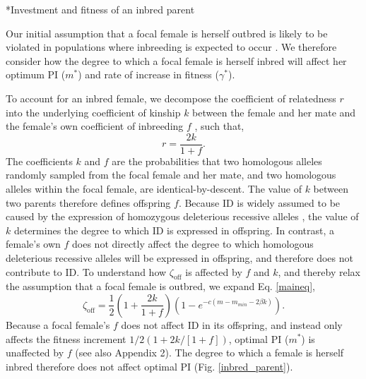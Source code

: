 \documentclass[12pt]{article}
\makeatletter
\renewcommand\subsection{\@startsection{subsection}{1}{-0.25in}{-0.5\baselineskip}{0.1\baselineskip}{\normalfont\normalsize\bfseries\textit}}
\makeatother
\begin{document}
\subsection*{Investment and fitness of an inbred parent}

Our initial assumption that a focal female is herself outbred is likely to be violated in populations where inbreeding is expected to occur \cite[][]{Duthie2015a}. We therefore consider how the degree to which a focal female is herself inbred will affect her optimum PI ($m^{*}$) and rate of increase in fitness ($\gamma^{*}$).

To account for an inbred female, we decompose the coefficient of relatedness $r$ into the underlying coefficient of kinship $k$ between the female and her mate and the female's own coefficient of inbreeding $f$ \cite[see][]{Hamilton1972, Michod1979}, such that,
\begin{equation} \label{rdef}
r = \frac{2k}{1 + f}.
\end{equation} %
The coefficients $k$ and $f$ are the probabilities that two homologous alleles randomly sampled from the focal female and her mate, and two homologous alleles within the focal female, are identical-by-descent. The value of $k$ between two parents therefore defines offspring $f$. Because ID is widely assumed to be caused by the expression of homozygous deleterious recessive alleles \cite[][]{Charlesworth2009}, the value of $k$ determines the degree to which ID is expressed in offspring. In contrast, a female's own $f$ does not directly affect the degree to which homologous deleterious recessive alleles will be expressed in offspring, and therefore does not contribute to ID. To understand how $\zeta_{\textrm{off}}$ is affected by $f$ and $k$, and thereby relax the assumption that a focal female is outbred, we expand Eq. \ref{maineq},
\begin{equation} \label{maineqr}
\zeta_{\textrm{off}} = \frac{1}{2}\left(1+\frac{2k}{1+f}\right)\left(1-e^{-c\left(m-m_{min}-2\beta k\right)}\right).
\end{equation}
Because a focal female's $f$ does not affect ID in its offspring, and instead only affects the fitness increment $1/2\left(1+ 2 k / \left[1 + f\right]\right)$, optimal PI ($m^{*}$) is unaffected by $f$  (see also Appendix 2). The degree to which a female is herself inbred therefore does not affect optimal PI (Fig. \ref{inbred_parent}). 
\end{document}

